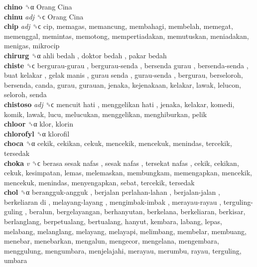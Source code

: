 \textbf{chino} ␝α   Orang Cina   \\
\textbf{chinu} \emph{adj}  ␝ϲ   Orang Cina   \\
\textbf{chip} \emph{adj}  ␝ϲ  cip, memagas, memancung, membahagi, membelah, memegat, memenggal, memintas, memotong, mempertiadakan, memutuskan, meniadakan, menigas, mikrocip  \\
\textbf{chirurg} ␝α   ahli bedah ,  doktor bedah ,  pakar bedah   \\
\textbf{chiste} ␝ϲ   bergurau-gurau ,  bergurau-senda ,  bersenda gurau ,  bersenda-senda ,  buat kelakar ,  gelak manis ,  gurau senda ,  gurau-senda , bergurau, berseloroh, bersenda, canda, gurau, gurauan, jenaka, kejenakaan, kelakar, lawak, lelucon, seloroh, senda  \\
\textbf{chistoso} \emph{adj}  ␝ϲ   mencuit hati ,  menggelikan hati , jenaka, kelakar, komedi, komik, lawak, lucu, melucukan, menggelikan, menghiburkan, pelik  \\
\textbf{chloor} ␝α  klor, klorin  \\
\textbf{chlorofyl} ␝α  klorofil  \\
\textbf{choca} ␝α  cekik, cekikan, cekuk, mencekik, mencekuk, menindas, tercekik, tersedak  \\
\textbf{choka} \emph{v}  ␝ϲ   berasa sesak nafas ,  sesak nafas ,  tersekat nafas , cekik, cekikan, cekuk, kesimpatan, lemas, melemaskan, membungkam, memengapkan, mencekik, mencekuk, menindas, menyengapkan, sebat, tercekik, tersedak  \\
\textbf{chol} ␝α   berangguk-angguk ,  berjalan perlahan-lahan ,  berjalan-jalan ,  berkeliaran di ,  melayang-layang ,  mengimbak-imbak ,  merayau-rayau ,  terguling-guling , beralun, bergelayangan, berhanyutan, berkelana, berkeliaran, berkisar, berlanglang, berpetualang, bertualang, hanyut, kembara, labang, lepas, melabang, melanglang, melayang, melayapi, melimbang, membelar, membuang, menebar, menebarkan, mengalun, mengecor, mengelana, mengembara, menggulung, mengumbara, menjelajahi, merayau, merumbu, rayau, terguling, umbara  \\
